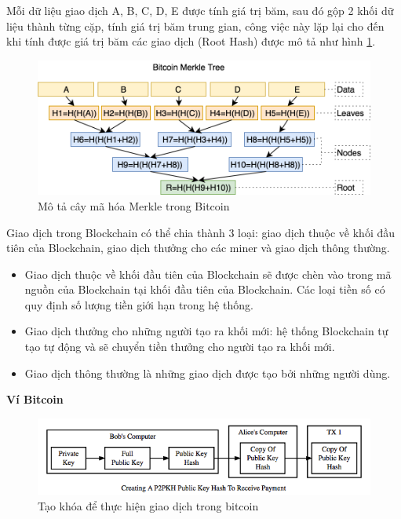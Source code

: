 Mỗi dữ liệu giao dịch A, B, C, D, E được tính giá trị băm, sau đó gộp 2 khối dữ liệu thành từng cặp, tính giá trị băm trung gian, công việc này lặp lại cho đến khi tính được giá trị băm các giao dịch (Root Hash) được mô tả như hình \ref{fig:merkle}. 

\begin{figure}[htbp]
\centering
\includegraphics[width=.9\linewidth]{img/merkle.png}
\caption{Mô tả cây mã hóa Merkle trong Bitcoin}
\label{fig:merkle}
\end{figure}

Giao dịch trong Blockchain có thể chia thành 3 loại: giao dịch  thuộc về khối đầu tiên của Blockchain, giao dịch thưởng cho các miner và giao dịch thông thường.

\begin{itemize}
\item Giao dịch thuộc về khối đầu tiên của Blockchain sẽ được chèn vào trong mã nguồn của Blockchain tại khối đầu tiên của Blockchain. Các loại tiền số có quy định số lượng tiền giới hạn trong hệ thống.
\item Giao dịch thưởng cho những người tạo ra khối mới: hệ thống Blockchain tự tạo tự động và sẽ chuyển tiền thưởng cho người tạo ra khối mới.
\item Giao dịch thông thường là những giao dịch được tạo bởi những người dùng. 
\end{itemize}

\textbf{Ví Bitcoin}

\begin{figure}[htbp]
\centering
\includegraphics[width=.9\linewidth]{img/P2PKH.png}
\caption{Tạo khóa để thực hiện giao dịch trong bitcoin}
\label{fig:wallet_bitcoin}
\end{figure}

